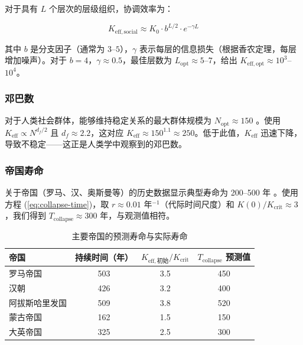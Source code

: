 \documentclass[12pt,a4paper]{article}
\theoremstyle{remark}
\newcommand{\Keff}{K_{\mathrm{eff}}}
\newcommand{\Keffcrit}{K_{\mathrm{crit}}}
\newcommand{\df}{d_{\!f}}
\begin{document}
	对于具有 $L$ 个层次的层级组织，协调效率为：
	
	\begin{equation}
		K_{\mathrm{eff},\text{social}} \approx K_0 \cdot b^{L/2} \cdot e^{-\gamma L}
		\label{eq:social-keff}
	\end{equation}
	
	其中 $b$ 是分支因子（通常为 $3$--$5$），$\gamma$ 表示每层的信息损失（根据香农定理，每层增加噪声）。对于 $b=4$，$\gamma \approx 0.5$，最佳层数为 $L_{\text{opt}} \approx 5$--$7$，给出 $K_{\mathrm{eff},\text{opt}} \approx 10^3$--$10^4$。
	
	\subsubsection{邓巴数}
	
	对于人类社会群体，能够维持稳定关系的最大群体规模为 $N_{\text{opt}} \approx 150$ \cite{Dunbar1992}。使用 $\Keff \propto N^{\df/2}$ 且 $\df \approx 2.2$，这对应 $\Keff \approx 150^{1.1} \approx 250$。低于此值，$\Keff$ 迅速下降，导致不稳定——这正是人类学中观察到的邓巴数。
	
	\subsubsection{帝国寿命}
	
	关于帝国（罗马、汉、奥斯曼等）的历史数据显示典型寿命为 200–500 年 \cite{TurchinNefedov2009}。使用方程 (\ref{eq:collapse-time})，取 $r \approx 0.01$ 年$^{-1}$（代际时间尺度）和 $K(0)/\Keffcrit \approx 3$，我们得到 $T_{\text{collapse}} \approx 300$ 年，与观测值相符。
	
	\begin{table}[htbp]
		\centering
		\caption{主要帝国的预测寿命与实际寿命 \cite{TurchinNefedov2009}}
		\label{tab:empires}
		\small
		\begin{tabular}{lccc}
			\toprule
			\textbf{帝国} & \textbf{持续时间（年）} & $K_{\mathrm{eff},\text{初始}}/\Keffcrit$ & $T_{\text{collapse}}$ 预测值 \\
			\midrule
			罗马帝国 & 503 & 3.5 & 450 \\
			汉朝 & 426 & 3.2 & 400 \\
			阿拔斯哈里发国 & 509 & 3.8 & 520 \\
			蒙古帝国 & 162 & 1.5 & 150 \\
			大英帝国 & 325 & 2.5 & 300 \\
			\bottomrule
		\end{tabular}
	\end{table}
	
\end{document}
